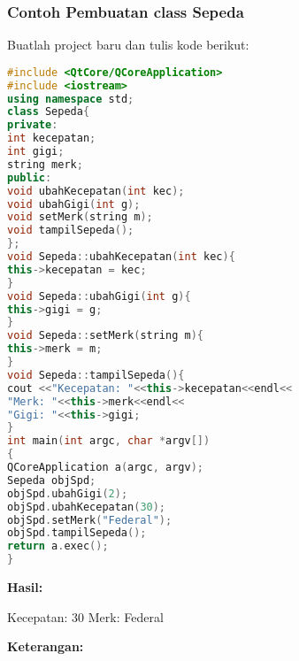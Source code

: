 \subsubsection*{Contoh  Pembuatan class Sepeda}

Buatlah project baru dan tulis kode berikut:

\begin{lstlisting}[language=c++, caption=Pembuatan class Sepeda, label=contoh6-1]
#include <QtCore/QCoreApplication>
#include <iostream>
using namespace std;
class Sepeda{
private:
int kecepatan;
int gigi;
string merk;
public:
void ubahKecepatan(int kec);
void ubahGigi(int g);
void setMerk(string m);
void tampilSepeda();
};
void Sepeda::ubahKecepatan(int kec){
this->kecepatan = kec;
}
void Sepeda::ubahGigi(int g){
this->gigi = g;
}
void Sepeda::setMerk(string m){
this->merk = m;
}
void Sepeda::tampilSepeda(){
cout <<"Kecepatan: "<<this->kecepatan<<endl<<
"Merk: "<<this->merk<<endl<<
"Gigi: "<<this->gigi;
}
int main(int argc, char *argv[])
{
QCoreApplication a(argc, argv);
Sepeda objSpd;
objSpd.ubahGigi(2);
objSpd.ubahKecepatan(30);
objSpd.setMerk("Federal");
objSpd.tampilSepeda();
return a.exec();
}
\end{lstlisting}

\textbf{Hasil:}

\begin{lcverbatim}
Kecepatan: 30 Merk: Federal
\end{lcverbatim}

\textbf{Keterangan:}

